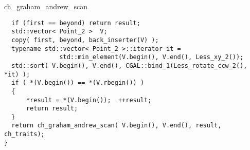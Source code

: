\begin{ccRefFunction}{ch_graham_andrew_scan}
\begin{verbatim}
  if (first == beyond) return result;
  std::vector< Point_2 >  V;
  copy( first, beyond, back_inserter(V) );
  typename std::vector< Point_2 >::iterator it = 
               std::min_element(V.begin(), V.end(), Less_xy_2());
  std::sort( V.begin(), V.end(), CGAL::bind_1(Less_rotate_ccw_2(), *it) );
  if ( *(V.begin()) == *(V.rbegin()) )
  {
      *result = *(V.begin());  ++result;
      return result;
  }
  return ch_graham_andrew_scan( V.begin(), V.end(), result, ch_traits);
}
\end{verbatim}


\end{ccRefFunction}


